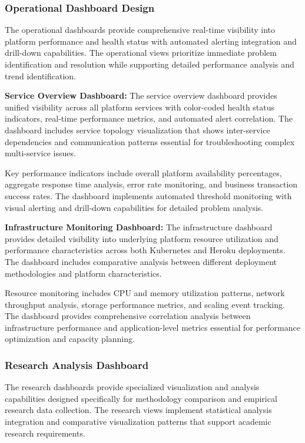 \subsubsection{Operational Dashboard Design}

The operational dashboards provide comprehensive real-time visibility into platform performance and health status with automated alerting integration and drill-down capabilities. The operational views prioritize immediate problem identification and resolution while supporting detailed performance analysis and trend identification.

\textbf{Service Overview Dashboard:}
The service overview dashboard provides unified visibility across all platform services with color-coded health status indicators, real-time performance metrics, and automated alert correlation. The dashboard includes service topology visualization that shows inter-service dependencies and communication patterns essential for troubleshooting complex multi-service issues.

Key performance indicators include overall platform availability percentages, aggregate response time analysis, error rate monitoring, and business transaction success rates. The dashboard implements automated threshold monitoring with visual alerting and drill-down capabilities for detailed problem analysis.

\textbf{Infrastructure Monitoring Dashboard:}
The infrastructure dashboard provides detailed visibility into underlying platform resource utilization and performance characteristics across both Kubernetes and Heroku deployments. The dashboard includes comparative analysis between different deployment methodologies and platform characteristics.

Resource monitoring includes CPU and memory utilization patterns, network throughput analysis, storage performance metrics, and scaling event tracking. The dashboard provides comprehensive correlation analysis between infrastructure performance and application-level metrics essential for performance optimization and capacity planning.

\subsubsection{Research Analysis Dashboard}

The research dashboards provide specialized visualization and analysis capabilities designed specifically for methodology comparison and empirical research data collection. The research views implement statistical analysis integration and comparative visualization patterns that support academic research requirements.

